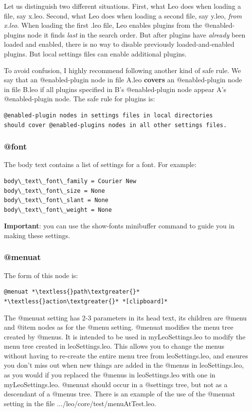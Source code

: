 \documentclass[a4paper,10pt,english]{sphinxmanual}
\begin{document}
Let us distinguish two different situations. First, what Leo does when loading a
file, say x.leo. Second, what Leo does when loading a second file, say y.leo,
\emph{from x.leo}. When loading the first .leo file, Leo enables plugins from the
@enabled-plugins node it finds \emph{last} in the search order. But after plugins
have \emph{already} been loaded and enabled, there is no way to disable previously
loaded-and-enabled plugins. But local settings files can enable additional
plugins.

To avoid confusion, I highly recommend following another kind of safe rule.
We say that an @enabled-plugin node in file A.leo \textbf{covers} an @enabled-plugin
node in file B.leo if all plugins specified in B's @enabled-plugin node appear
A's @enabled-plugin node. The safe rule for plugins is:

\begin{Verbatim}[commandchars=\\\{\}]
@enabled-plugin nodes in settings files in local directories
should cover @enabled-plugins nodes in all other settings files.
\end{Verbatim}


\subsubsection{@font}
\label{customizing:font}
The body text contains a list of settings for a font.  For example:

\begin{Verbatim}[commandchars=\\\{\}]
body\_text\_font\_family = Courier New
body\_text\_font\_size = None
body\_text\_font\_slant = None
body\_text\_font\_weight = None
\end{Verbatim}

\textbf{Important}: you can use the show-fonts minibuffer command to guide you in making these settings.


\subsubsection{@menuat}
\label{customizing:menuat}
The form of this node is:

\begin{Verbatim}[commandchars=\\\{\}]
@menuat *\textless{}path\textgreater{}* *\textless{}action\textgreater{}* *[clipboard]*
\end{Verbatim}

The @menuat setting has 2-3 parameters in its head text, its children are @menu and
@item nodes as for the @menu setting.  @menuat modifies the menu tree created by @menus.
It is intended to be used in myLeoSettings.leo to modify the menu tree created
in leoSettings.leo. This allows you to change the menus without having to
re-create the entire menu tree from leoSettings.leo, and ensures you don't miss
out when new things are added in the @menus in leoSettings.leo, as you would if
you replaced the @menus in leoSettings.leo with one in myLeoSettings.leo.
@menuat should occur in a @settings tree, but not as a descendant of a @menus
tree. There is an example of the use of the
@menuat setting in the file .../leo/core/test/menuAtTest.leo.
\end{document}

